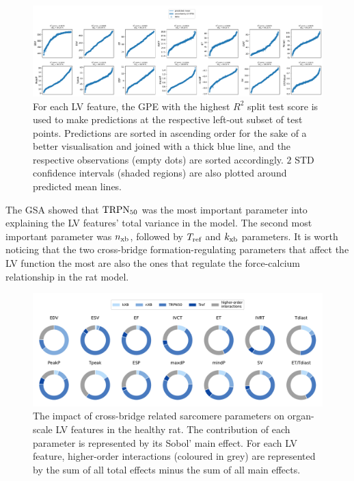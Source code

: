 \begin{figure}[!ht]
    \myfloatalign
    \includegraphics[width=\textwidth]{figures/chapter05/bgpes_vs_bsplit_om.pdf}
    \caption{For each LV feature, the GPE with the highest $R^2$ split test score is used to make predictions at the respective left-out subset of test points. Predictions are sorted in ascending order for the sake of a better visualisation and joined with a thick blue line, and the respective observations (empty dots) are sorted accordingly. $2$ STD confidence intervals (shaded regions) are also plotted around predicted mean lines.}
    \label{fig:omgpes}
\end{figure}

\vspace{0.2cm}
The GSA showed that $\textrm{TRPN}_{50}$ was the most important parameter into explaining the LV features' total variance in the model. The second most important parameter was $n_{\textrm{xb}}$, followed by $T_{\textrm{ref}}$ and $k_{\textrm{xb}}$ parameters. It is worth noticing that the two cross-bridge formation-regulating parameters that affect the LV function the most are also the ones that regulate the force-calcium relationship in the rat model.

\begin{figure}[!ht]
    \myfloatalign
    \includegraphics[width=\textwidth]{figures/chapter05/gsa_om.pdf}
    \caption{The impact of cross-bridge related sarcomere parameters on organ-scale LV features in the healthy rat. The contribution of each parameter is represented by its Sobol' main effect. For each LV feature, higher-order interactions (coloured in grey) are represented by the sum of all total effects minus the sum of all main effects.}
    \label{fig:omgsa}
\end{figure}



